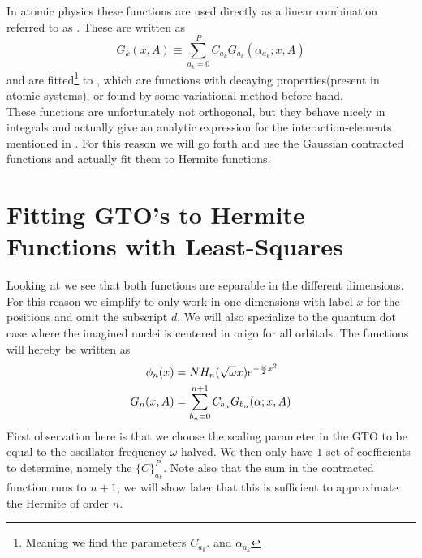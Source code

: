     In atomic physics these functions are used directly as a linear combination
    referred to as . These are written as
        \begin{equation}
            G_k(x, A) \equiv \sum\limits^P_{a_k=0} C_{a_k}
            G_{a_k}(\alpha_{a_k};x, A)
        \end{equation}
    and are fitted\footnote{Meaning we find the parameters $C_{a_k}.$ and
    $\alpha_{a_k}$} to , which are functions with
    decaying properties(present in atomic systems), or found by some variational
    method before-hand. \\

    These functions are unfortunately not orthogonal, but they behave nicely in
    integrals and actually give an analytic expression for the
    interaction-elements mentioned in . For this reason we
    will go forth and use the Gaussian contracted functions and actually fit
    them to Hermite functions.

\section{Fitting GTO's to Hermite Functions with Least-Squares}
    Looking at  we see that both functions are
    separable in the different dimensions. For this reason we simplify to only
    work in one dimensions with label $x$ for the positions and omit the
    subscript $d$. We will also specialize to the quantum dot case where the
    imagined nuclei is centered in origo for all orbitals. The functions will
    hereby be written as
        \begin{equation}
            \begin{aligned}
                \phi_n(x) &= NH_n(\sqrt{\omega}x)\mathrm{e}^{-\frac{\omega}{2}x^2} \\
                G_n(x, A) &= \sum\limits^{n+1}_{b_n=0} C_{b_n}
                G_{b_n}(\alpha;x, A)
            \end{aligned}
        \end{equation}
    First observation here is that we choose the scaling parameter in the GTO
    to be equal to the oscillator frequency $\omega$ halved. We then only have
    $1$ set of coefficients to determine, namely the $\{C\}^P_{a_k}$. Note also
    that the sum in the contracted function runs to $n+1$, we will show later
    that this is sufficient to approximate the Hermite of order $n$.

